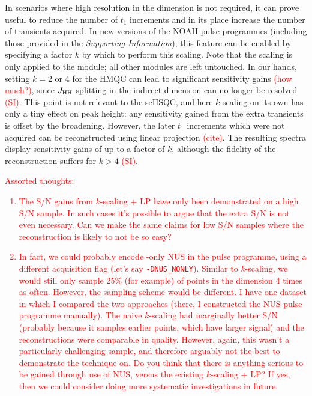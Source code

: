 \documentclass[11pt]{article}
\newcommand*{\nitrogen}{\ce{^{15}N}}
\newcommand*{\red}[1]{\textcolor{red}{#1}}
\newcommand*{\jhh}{J_{\ce{HH}}}
\newcommand*{\SInf}{\textit{Supporting Information}}
\newcommand*{\sitodo}{\red{(SI)}}
\begin{document}
In scenarios where high resolution in the \nitrogen{} dimension is not required, it can prove useful to reduce the number of $t_1$ increments and in its place increase the number of transients acquired.\autocite{Perez-Trujillo2007MRC, Parella2010CMR}
In new versions of the NOAH pulse programmes (including those provided in the \SInf{}), this feature can be enabled by specifying a factor $k$ by which to perform this scaling.
Note that the scaling is only applied to the \nitrogen{} module; all other modules are left untouched.
In our hands, setting $k = 2$ or 4 for the \nitrogen{} HMQC can lead to significant sensitivity gains \red{(how much?)}, since $\jhh$ splitting in the indirect dimension can no longer be resolved \sitodo{}.
This point is not relevant to the seHSQC, and here $k$-scaling on its own has only a tiny effect on peak height: any sensitivity gained from the extra transients is offset by the broadening.
However, the later $t_1$ increments which were not acquired can be reconstructed using linear projection \red{(cite)}.
The resulting spectra display sensitivity gains of up to a factor of $k$, although the fidelity of the reconstruction suffers for $k > 4$ \sitodo.

\red{
    Assorted thoughts:
    \begin{enumerate}
        \item The S/N gains from $k$-scaling + LP have only been demonstrated on a high S/N sample.
            In such cases it's possible to argue that the extra S/N is not even necessary.
            Can we make the same claims for low S/N samples where the reconstruction is likely to not be so easy?
        \item In fact, we could probably encode \nitrogen{}-only NUS in the pulse programme, using a different acquisition flag (let's say \texttt{-DNUS\_NONLY}).
            Similar to $k$-scaling, we would still only sample 25\% (for example) of points in the \nitrogen{} dimension 4 times as often.
            However, the sampling scheme would be different.
            I have one dataset in which I compared the two approaches (there, I constructed the NUS pulse programme manually).
            The naive $k$-scaling had marginally better S/N (probably because it samples earlier points, which have larger signal) and the reconstructions were comparable in quality.
            However, again, this wasn't a particularly challenging sample, and therefore arguably not the best to demonstrate the technique on.
            Do you think that there is anything serious to be gained through use of NUS, versus the existing $k$-scaling + LP?
            If yes, then we could consider doing more systematic investigations in future.
    \end{enumerate}
}
\end{document}

